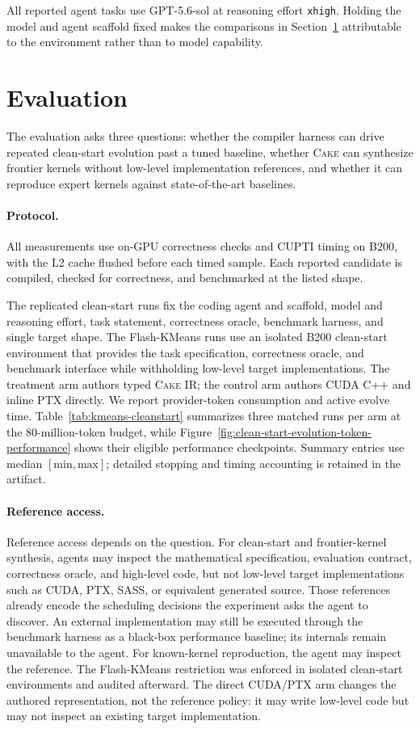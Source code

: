 \documentclass[11pt]{article}
\newcommand{\cake}{\textsc{Cake}}
\newcommand{\cakeir}{\textsc{Cake IR}}
\begin{document}
All reported agent tasks use GPT-5.6-sol \cite{openai2026gpt56} at reasoning
effort \texttt{xhigh}. Holding the model and agent scaffold fixed makes the
comparisons in Section~\ref{sec:evaluation} attributable to the environment
rather than to model capability.

\section{Evaluation}
\label{sec:evaluation}

The evaluation asks three questions: whether the compiler harness can drive
repeated clean-start evolution past a tuned baseline, whether \cake{} can
synthesize frontier kernels without low-level implementation references, and
whether it can reproduce expert kernels against state-of-the-art baselines.

\paragraph{Protocol.}
All measurements use on-GPU correctness checks and CUPTI timing on B200, with
the L2 cache flushed before each timed sample. Each reported candidate is
compiled, checked for correctness, and benchmarked at the listed shape.

The replicated clean-start runs fix the coding agent and scaffold, model and
reasoning effort, task statement, correctness oracle, benchmark harness, and
single target shape. The Flash-KMeans runs use an isolated B200 clean-start
environment that provides the task specification, correctness oracle, and
benchmark interface while withholding low-level target implementations. The
treatment arm authors typed \cakeir{}; the control arm authors CUDA C++ and
inline PTX directly. We report provider-token consumption and active evolve
time. Table~\ref{tab:kmeans-cleanstart} summarizes three matched runs per arm at
the 80-million-token budget, while
Figure~\ref{fig:clean-start-evolution-token-performance} shows their eligible
performance checkpoints. Summary entries use median
$[\mathrm{min},\mathrm{max}]$; detailed stopping and timing accounting is
retained in the artifact.

\paragraph{Reference access.}
Reference access depends on the question. For clean-start and frontier-kernel
synthesis, agents may inspect the mathematical specification, evaluation
contract, correctness oracle, and high-level code, but not low-level target
implementations such as CUDA, PTX, SASS, or equivalent generated source. Those
references already encode the scheduling decisions the experiment asks the
agent to discover. An external implementation may still be executed through the
benchmark harness as a black-box performance baseline; its internals remain
unavailable to the agent. For known-kernel reproduction, the agent may inspect
the reference. The Flash-KMeans restriction was enforced in isolated
clean-start environments and audited afterward. The direct CUDA/PTX arm changes
the authored representation, not the reference policy: it may write low-level
code but may not inspect an existing target implementation.
\end{document}
